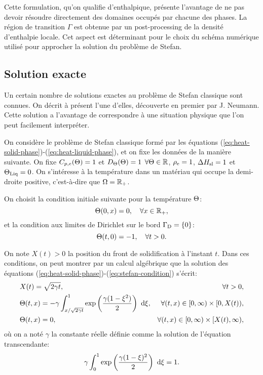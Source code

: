 Cette formulation, qu'on qualifie d'enthalpique, présente l'avantage
de ne pas devoir résoudre directement des domaines occupés par chacune
des phases. La région de transition $\Gamma$ est obtenue par un
post-processing de la densité d'enthalpie locale. Cet aspect est
déterminant pour le choix du schéma numérique utilisé pour approcher
la solution du problème de Stefan.


\subsection*{Solution exacte}
Un certain nombre de solutions exactes au problème de Stefan
classique sont connues. On décrit à présent l'une d'elles, découverte en
premier par J. Neumann. Cette solution a l'avantage de correspondre à
une situation physique que l'on peut facilement interpréter.

On considère le problème de Stefan classique formé par les équations
(\ref{eq:heat-solid-phase})-(\ref{eq:heat-liquid-phase}), et on fixe
les données de la manière suivante. On fixe
$C_{p,e}(\Theta) = 1$ et
$D_\Theta(\Theta)=1$ $\forall\Theta \in \mathbb
R$, $\rho_\mathrm{e} = 1$, $\Delta H_\mathrm{sl} = 1$ et $\Theta_\text{Liq} =
0$. On s'intéresse à la température dans un matériau qui occupe la
demi-droite positive, c'est-à-dire que $\Omega = \mathbb R_+$.

On choisit la condition initiale suivante pour la température
$\Theta$:
\begin{equation}
  \Theta(0, x) = 0, \quad \forall x\in\mathbb R_+,
\end{equation}
et la condition aux limites de Dirichlet sur le bord $\Gamma_\mathrm{D} =
\left\{ 0 \right\}$:
\begin{equation}
  \Theta(t, 0) = -1, \quad \forall t > 0.
\end{equation}

On note $X(t) > 0$ la position du front de solidification à l'instant
$t$. Dans ces conditions, on peut montrer par un calcul algébrique que
la solution des équations
(\ref{eq:heat-solid-phase})-(\ref{eq:stefan-condition}) s'écrit:
\begin{align}
  & X(t) = \sqrt{2\gamma t},& \forall t > 0,\label{eq:neumann-sol-frontier}\\
  & \temperature(t, x) = -\gamma\int_{x / \sqrt{2\gamma
      t}}^1\exp\parent{\frac{\gamma(1 - \xi^2)}{2}}\, \intd{\xi},%
  & \forall (t, x) \in [0,\infty)\times[0,X(t)),\label{eq:neumann-sol-solid-phase}\\
    & \temperature(t, x) = 0,
    & \forall (t, x) \in [0,\infty)\times[X(t), \infty),\label{eq:neumann-sol-liquid-phase}
\end{align}
où on a noté $\gamma$ la constante réelle définie comme la solution de
l'équation transcendante:
\begin{equation}
  \gamma \int_0^1\exp\left( \frac{\gamma(1 - \xi)^2}{2} \right)\,\,\mathrm d\xi
  = 1.
\end{equation}

